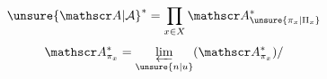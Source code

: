 \[{\unsure{\mathscr A|\mathcal A}}^{*}=\prod_{x\in X}\mathscr A^{*}_{{\unsure{\pi_x|\Pi_x}}}\]
\[\mathscr A^{*}_{\pi_x}=\varprojlim_{{\unsure{n|u}}}(\mathscr A^{*}_{\pi_x})/\]

